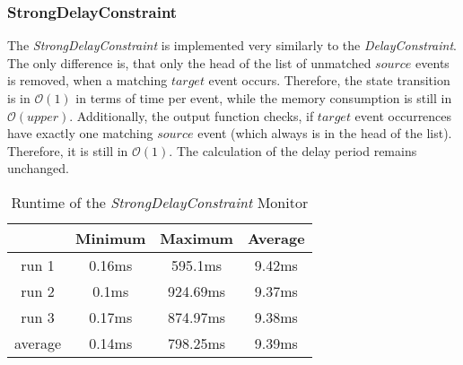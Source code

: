 \subsubsection{StrongDelayConstraint}
	The \emph{StrongDelayConstraint} is implemented very similarly to the \emph{DelayConstraint}. The only difference is, that only the head of the list of unmatched $source$ events is removed, when a matching $target$ event occurs. Therefore, the state transition is in $\mathcal{O}(1)$ in terms of time per event, while the memory consumption is still in  $\mathcal{O}(upper)$. Additionally, the output function checks, if $target$ event occurrences have exactly one matching $source$ event (which always is in the head of the list). Therefore, it is still in $\mathcal{O}(1)$. The calculation of the delay period remains unchanged.\\
	\begin{table}
		\begin{tabular}{|c|c|c|c|}
			\hline
			& Minimum & Maximum & Average \\
			\hline
			run 1	& 0.16ms & 595.1ms & 9.42ms\\
			\hline
			run 2	& 0.1ms & 924.69ms & 9.37ms\\
			\hline
			run 3	& 0.17ms & 874.97ms & 9.38ms\\
			\hline
			average & 0.14ms & 798.25ms &9.39ms\\
			\hline
		\end{tabular}
		\centering
		\label{tab:runtimeStrongDelay}
		\caption{Runtime of the \emph{StrongDelayConstraint} Monitor}
	\end{table}
	

